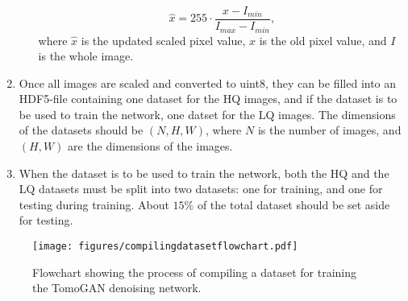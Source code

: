 \begin{enumerate}
\begin{enumerate}
        \begin{equation}
            \label{eq:scaleimages}
            \hat{x} = 255 \cdot \frac{x - I_{min}}{I_{max} - I_{min}},
        \end{equation}
        where $\hat{x}$ is the updated scaled pixel value, $x$ is the old pixel value, and $I$ is the whole image.
    \end{enumerate}
    \item Once all images are scaled and converted to uint8, they can be filled into an HDF5-file containing one dataset for the HQ images, and if the dataset is to be used to train the network, one datset for the LQ images. The dimensions of the datasets should be $(N,H,W)$, where $N$ is the number of images, and $(H,W)$ are the dimensions of the images. 
    \item When the dataset is to be used to train the network, both the HQ and the LQ datasets must be split into two datasets: one for training, and one for testing during training. About $15\%$ of the total dataset should be set aside for testing. 
\end{enumerate}


\begin{figure}[htbp]  
    \centering
    \texttt{[image: figures/compilingdatasetflowchart.pdf]}
    \caption[Dataset creation flowchart]{Flowchart showing the process of compiling a dataset for training the TomoGAN denoising network. }
    \label{fig:compilingdatasetflowchart}
\end{figure}
